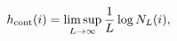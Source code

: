 \setcounter{equation}{8}
\begin{equation}
h_{\rm cont}(i)=\limsup_{L\to\infty}\frac{1}{L}\log N_L(i),
\end{equation}
